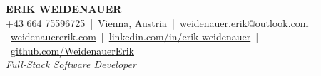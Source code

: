 \documentclass[11pt]{article}
\begin{document}
\begin{center}
  {\bfseries\Large \MakeUppercase{Erik Weidenauer}}\\[3pt]
  +43 664 75596725\ |\ Vienna, Austria\ |\
  \href{mailto:weidenauer.erik@outlook.com}{weidenauer.erik@outlook.com}\ |\
  \href{https://weidenauererik.com}{weidenauererik.com}\ |\
  \href{https://linkedin.com/in/erik-weidenauer}{linkedin.com/in/erik-weidenauer}\ |\
  \href{https://github.com/WeidenauerErik}{github.com/WeidenauerErik}\\[4pt]
  {\itshape\small Full-Stack Software Developer}
\end{center}
\vspace{4pt}



\newpage




\end{document}
